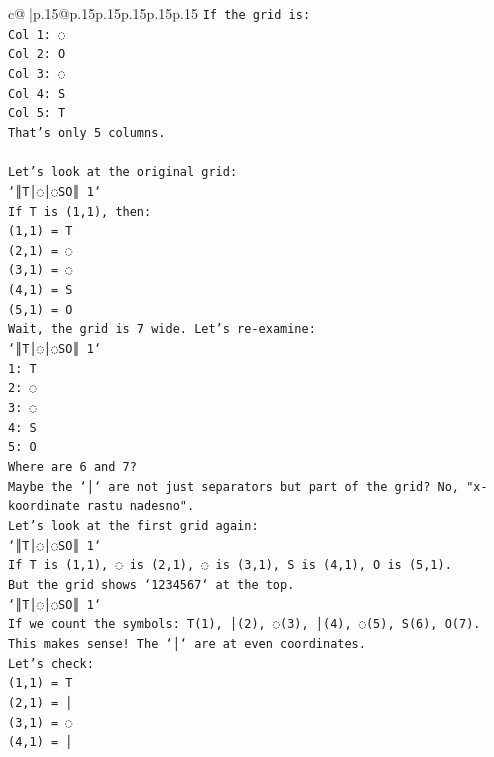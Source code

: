 \documentclass{article}
\begin{document}
{\begin{supertabular}{c@{$\;$}|p{.15\linewidth}@{}p{.15\linewidth}p{.15\linewidth}p{.15\linewidth}p{.15\linewidth}p{.15\linewidth}}
{{{\texttt{If the grid is:} \\
\texttt{Col 1: ◌} \\
\texttt{Col 2: O} \\
\texttt{Col 3: ◌} \\
\texttt{Col 4: S} \\
\texttt{Col 5: T} \\
\texttt{That's only 5 columns.} \\
\\ 
\texttt{Let's look at the original grid:} \\
\texttt{`║T│◌│◌SO║ 1`} \\
\texttt{If T is (1,1), then:} \\
\texttt{(1,1) = T} \\
\texttt{(2,1) = ◌} \\
\texttt{(3,1) = ◌} \\
\texttt{(4,1) = S} \\
\texttt{(5,1) = O} \\
\texttt{Wait, the grid is 7 wide. Let's re{-}examine:} \\
\texttt{`║T│◌│◌SO║ 1`} \\
\texttt{1: T} \\
\texttt{2: ◌} \\
\texttt{3: ◌} \\
\texttt{4: S} \\
\texttt{5: O} \\
\texttt{Where are 6 and 7?} \\
\texttt{Maybe the `│` are not just separators but part of the grid? No, "x{-}koordinate rastu nadesno".} \\
\texttt{Let's look at the first grid again:} \\
\texttt{`║T│◌│◌SO║ 1`} \\
\texttt{If T is (1,1), ◌ is (2,1), ◌ is (3,1), S is (4,1), O is (5,1).} \\
\texttt{But the grid shows `1234567` at the top.} \\
\texttt{`║T│◌│◌SO║ 1`} \\
\texttt{If we count the symbols: T(1), │(2), ◌(3), │(4), ◌(5), S(6), O(7).} \\
\texttt{This makes sense! The `│` are at even coordinates.} \\
\texttt{Let's check:} \\
\texttt{(1,1) = T} \\
\texttt{(2,1) = │} \\
\texttt{(3,1) = ◌} \\
\texttt{(4,1) = │} \\
}}}
\end{supertabular}}
\end{document}
